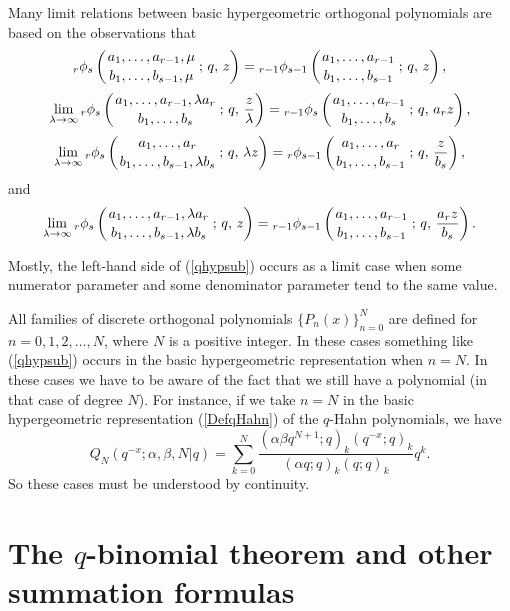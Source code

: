 \documentclass[envcountchap,graybox]{svmono}
\newcommand{\qhyp}[5]{\mbox{}_{#1}{\phi}_{#2}
\left(\genfrac{}{}{0pt}{}{#3}{#4}\,;\,q,\,#5\right)}
\begin{document}
Many limit relations between basic hypergeometric orthogonal polynomials
are based on the observations that
\begin{equation}
\label{qhypsub}
\qhyp{r}{s}{a_1,\ldots,a_{r-1},\mu}{b_1,\ldots,b_{s-1},\mu}{z}=
\qhyp{r-1}{s-1}{a_1,\ldots,a_{r-1}}{b_1,\ldots,b_{s-1}}{z},
\end{equation}
\begin{equation}
\label{qhyplim1}
\lim\limits_{\lambda\rightarrow\infty}
\qhyp{r}{s}{a_1,\ldots,a_{r-1},\lambda a_r}{b_1,\ldots,b_s}{\frac{z}{\lambda}}
=\qhyp{r-1}{s}{a_1,\ldots,a_{r-1}}{b_1,\ldots,b_s}{a_rz},
\end{equation}
\begin{equation}
\label{qhyplim2}
\lim\limits_{\lambda\rightarrow\infty}
\qhyp{r}{s}{a_1,\ldots,a_r}{b_1,\ldots,b_{s-1},\lambda b_s}{\lambda z}=
\qhyp{r}{s-1}{a_1,\ldots,a_r}{b_1,\ldots,b_{s-1}}{\frac{z}{b_s}},
\end{equation}
and
\begin{equation}
\label{qhyplim3}
\lim\limits_{\lambda\rightarrow\infty}
\qhyp{r}{s}{a_1,\ldots,a_{r-1},\lambda a_r}{b_1,\ldots,b_{s-1},\lambda b_s}{z}
=\qhyp{r-1}{s-1}{a_1,\ldots,a_{r-1}}{b_1,\ldots,b_{s-1}}{\frac{a_rz}{b_s}}.
\end{equation}

Mostly, the left-hand side of (\ref{qhypsub}) occurs as a limit case when some numerator
parameter and some denominator parameter tend to the same value.

All families of discrete orthogonal polynomials $\{P_n(x)\}_{n=0}^N$ are
defined for $n=0,1,2,\ldots,N$, where $N$ is a positive integer. In these
cases something like (\ref{qhypsub}) occurs in the basic hypergeometric representation
when $n=N$. In these cases we have to be aware of the fact that we still have a polynomial
(in that case of degree $N$). For instance, if we take $n=N$ in the basic hypergeometric
representation (\ref{DefqHahn}) of the $q$-Hahn polynomials, we have
$$Q_N(q^{-x};\alpha,\beta,N|q)=\sum_{k=0}^N
\frac{(\alpha\beta q^{N+1};q)_k(q^{-x};q)_k}{(\alpha q;q)_k(q;q)_k}q^k.$$
So these cases must be understood by continuity.

\section{The $q$-binomial theorem and other summation formulas}
\par\setcounter{equation}{0}
\label{qsummation formulas}
\end{document}
